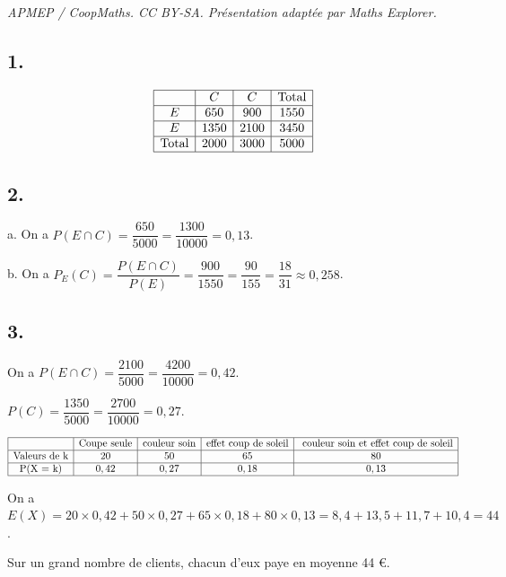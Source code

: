 \documentclass[10pt]{article}
\begin{document}
\noindent\textit{APMEP / CoopMaths. CC BY-SA. Présentation adaptée par Maths Explorer.}\par\medskip
\subsection*{1.}
	
	\[
	\begin{array}{|c|c|c|c|}
		\hline
		& C & C &\text{Total} \\
		\hline
		E & 650 & 900 & 1550 \\
		\hline
		E & 1350 & 2100 & 3450 \\
		\hline
		\text{Total} & 2000 & 3000 & 5000 \\
		\hline
	\end{array}
	\]
	
	\subsection*{2.}
	
	a. On a \(P(E \cap C) = \dfrac{650}{5000} = \dfrac{1300}{10000} = 0,13\).
	
	b. On a \(P_E(C) = \dfrac{P(E \cap C)}{P(E)} = \dfrac{900}{1550} = \dfrac{90}{155} = \dfrac{18}{31} \approx 0,258\).
	
	\subsection*{3.}
	
	On a \(P(E \cap C) = \dfrac{2100}{5000} = \dfrac{4200}{10000} = 0,42\).
	
	\(P(C) = \dfrac{1350}{5000} = \dfrac{2700}{10000} = 0,27\).
	
	\[
	\begin{array}{|c|c|c|c|c|}
		\hline
		&\text{Coupe seule} & \text{couleur soin} & \text{effet coup de soleil} & \text{ couleur soin et effet coup de soleil} \\
		\hline
		\text{Valeurs de k} & 20 & 50 & 65 & 80 \\
		\hline
		\text{P(X = k)} & 0,42 & 0,27 & 0,18 & 0,13 \\
		\hline
	\end{array}
	\]
	
	On a \(E(X) = 20 \times 0,42 + 50 \times 0,27 + 65 \times 0,18 + 80 \times 0,13 = 8,4 + 13,5 + 11,7 + 10,4 = 44\).
	
	Sur un grand nombre de clients, chacun d’eux paye en moyenne 44 €.
\end{document}
